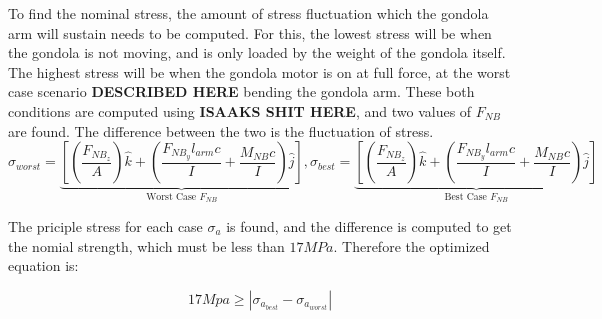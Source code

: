\documentclass[../main.tex]{subfiles}
\begin{document}
To find the nominal stress, the amount of stress fluctuation which the gondola arm will sustain needs to be computed. For this, the lowest stress will be when the gondola is not moving, and is only loaded by the weight of the gondola itself. The highest stress will be when the gondola motor is on at full force, at the worst case scenario \textbf{DESCRIBED HERE} bending the gondola arm. These both conditions are computed using \textbf{ISAAKS SHIT HERE}, and two values of $F_{NB}$ are found. The difference between the two is the fluctuation of stress.
\begin{equation}
	\sigma_{worst}= \underbrace{\left[\left(\dfrac{F_{NB_{z}}}{A}\right)\hat{k} + \left(\dfrac{F_{NB_{y}}l_{arm}c}{I}  + \dfrac{M_{NB}c}{I} \right) \hat{j}\right]}_\text{Worst Case $F_{NB}$}, \sigma_{best} = \underbrace{\left[\left(\dfrac{F_{NB_{z}}}{A}\right)\hat{k} + \left(\dfrac{F_{NB_{y}}l_{arm}c}{I}  + \dfrac{M_{NB}c}{I} \right) \hat{j}\right]}_\text{Best Case $F_{NB}$}
\end{equation}

The priciple stress for each case $\sigma _a$ is found, and the difference is computed to get the nomial strength, which must be less than $17MPa$. Therefore the optimized equation is:

\begin{equation}
	17Mpa \geq \left|\sigma _{a_{best}}-\sigma _{a_{worst}}\right|
\end{equation} 
\end{document}
